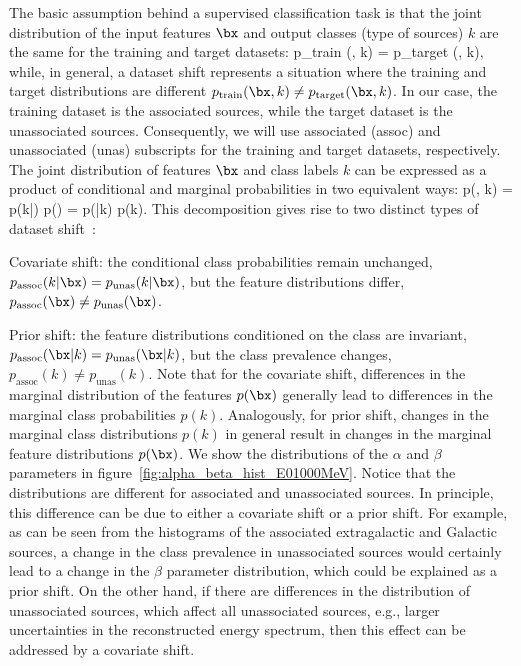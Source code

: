 The basic assumption behind a supervised classification task is that the joint distribution of the input features $\bx$
and output classes (type of sources) $k$  are the same for the training and target datasets:
\be
p_\textrm{train} (\bx, k) = p_\textrm{target} (\bx, k),
\ee
while, in general, a dataset shift represents a situation where the training and target distributions are different
$p_\textrm{train} (\bx, k) \neq p_\textrm{target} (\bx, k)$.
In our case, the training dataset is the associated sources, while the target dataset is the unassociated sources.
Consequently, we will use associated (assoc) and unassociated (unas) subscripts for the training and target datasets, respectively.
\\
The joint distribution of features $\bx$ and class labels $k$ can be expressed as a product of conditional and marginal probabilities in two equivalent ways:
\be
p(\bx, k) = p(k|\bx) p(\bx) = p(\bx|k) p(k).
\ee
This decomposition gives rise to two distinct types of dataset shift~\citep{MorenoTorres2012AUV}:
\ben
\item
{ Covariate shift}: the conditional class probabilities remain unchanged,\\
{$p_\textrm{assoc}(k|\bx) = p_\textrm{unas}(k|\bx)$}, but the feature distributions differ, $p_\textrm{assoc}(\bx) \neq p_\textrm{unas}(\bx)$.
\item
{ Prior shift}: the feature distributions conditioned on the class are invariant, $p_\textrm{assoc}(\bx|k) = p_\textrm{unas}(\bx|k)$, but the class prevalence changes, $p_\textrm{assoc}(k) \neq p_\textrm{unas}(k)$.
\een
Note that for the covariate shift, differences in the marginal distribution of the features $p(\bx)$ generally lead to differences in the marginal class probabilities $p(k)$.
Analogously, for prior shift, changes in the marginal class distributions $p(k)$ in general result in changes in the marginal feature distributions $p(\bx)$. We show the distributions of the $\alpha$ and $\beta$ parameters in figure~\ref{fig:alpha_beta_hist_E01000MeV}. Notice that the distributions are different for associated and unassociated sources.
In principle, this difference can be due to either a covariate shift or a prior shift. 
For example, as can be seen from the histograms of the associated extragalactic and Galactic sources, a change in the class prevalence in unassociated sources would certainly lead to a change in the $\beta$ parameter distribution, which could be explained as a prior shift.
On the other hand, if there are differences in the distribution of unassociated sources, which affect all unassociated sources, e.g., larger uncertainties in the reconstructed energy spectrum, 
then this effect can be addressed by a covariate shift.

